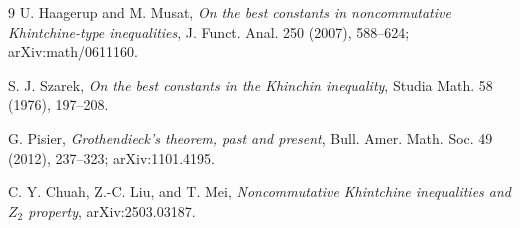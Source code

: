 \documentclass[11pt]{article}
\begin{document}
\begin{thebibliography}{9}
U. Haagerup and M. Musat,
\emph{On the best constants in noncommutative Khintchine-type inequalities},
J. Funct. Anal. 250 (2007), 588--624; arXiv:math/0611160.

S. J. Szarek,
\emph{On the best constants in the Khinchin inequality},
Studia Math. 58 (1976), 197--208.

G. Pisier,
\emph{Grothendieck's theorem, past and present},
Bull. Amer. Math. Soc. 49 (2012), 237--323; arXiv:1101.4195.

C. Y. Chuah, Z.-C. Liu, and T. Mei,
\emph{Noncommutative Khintchine inequalities and \(Z_2\) property},
arXiv:2503.03187.
\end{thebibliography}
\end{document}
